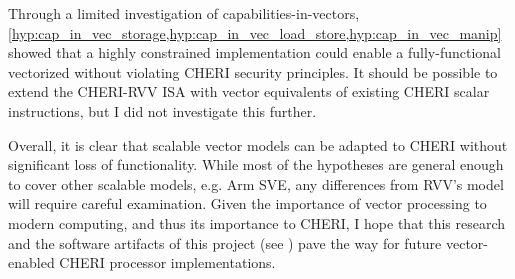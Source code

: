 Through a limited investigation of capabilities-in-vectors, \cref{hyp:cap_in_vec_storage,hyp:cap_in_vec_load_store,hyp:cap_in_vec_manip} showed that a highly constrained implementation could enable a fully-functional vectorized  without violating CHERI security principles.
It should be possible to extend the CHERI-RVV ISA with vector equivalents of existing CHERI scalar instructions, but I did not investigate this further.

Overall, it is clear that scalable vector models can be adapted to CHERI without significant loss of functionality.
While most of the hypotheses are general enough to cover other scalable models, e.g. Arm SVE, any differences from RVV's model will require careful examination.
Given the importance of vector processing to modern computing, and thus its importance to CHERI, I hope that this research and the software artifacts of this project (see ) pave the way for future vector-enabled CHERI processor implementations.


